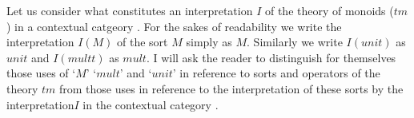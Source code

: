 

\note Let us consider what constitutes an interpretation $I$ of the theory of monoids ($tm$) in a contextual catgeory \catc.
For the sakes of readability we write the interpretation $I(M)$ of the sort $M$ simply as $M$. Similarly we write $I(unit)$ as $unit$ and $I(multt)$ as $mult$. I will ask the reader  to distinguish for themselves 
those uses of `$M$' `$mult$' and `$unit$' in reference to sorts and operators of the theory $tm$ from those uses in reference to the interpretation of these sorts by the interpretation$I$ in the contextual category \catc. 

\newcommand{\wM}{\ofT{w}{M}}
\newcommand{\xM}{\ofT{x_1, x_2}{M}}
\newcommand{\yM}{\ofT{y_1, y_2, y_3}{M}}
\newcommand{\doubleM}{M^2}                       %
\newcommand{\trebleM}{M^3}                       %
\newcommand{\quadM}{M^4}                         %
\newcommand{\spi}{s(p_{M^3,M^i})}
\newcommand{\sptrebleone}{s(p_{M^3,M^1})}
\newcommand{\sptrebletwo}{s(p_{M^3,M^2})}
\newcommand{\sptreblethree}{s(p_{M^3,M^3})}


